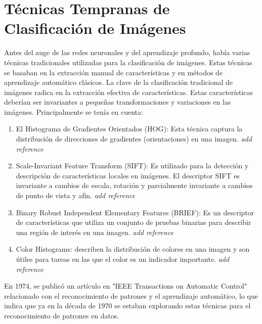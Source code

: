 \section*{Técnicas Tempranas de Clasificación de Imágenes} 

Antes del auge de las redes neuronales y del aprendizaje profundo, había varias técnicas tradicionales utilizadas para la clasificación de imágenes. Estas técnicas se 
basaban en la extracción manual de características y en métodos de aprendizaje automático clásicos. La clave de la clasificación tradicional de imágenes radica en la 
extracción efectiva de características. Estas características deberían ser invariantes a pequeñas transformaciones y variaciones en las imágenes. Principalmente se tenía en cuenta:


\begin{enumerate}
    \item El Histograma de Gradientes Orientados (HOG): Esta técnica captura la distribución de direcciones de gradientes (orientaciones) en una imagen. \textit{add reference}
    
    \item Scale-Invariant Feature Transform (SIFT): Es utilizado para la detección y descripción de características locales en imágenes. El descriptor SIFT es invariante a cambios de escala, rotación y parcialmente invariante a cambios de punto de vista y afín. \textit{add reference}
    
    \item Binary Robust Independent Elementary Features (BRIEF): Es un descriptor de características que utiliza un conjunto de pruebas binarias para describir una región de interés en una imagen. \textit{add reference}
    
    \item Color Histograms: describen la distribución de colores en una imagen y son útiles para tareas en las que el color es un indicador importante. \textit{add reference}
\end{enumerate}

En 1974, se publicó un artículo en "IEEE Transactions on Automatic Control" %
relacionado con el reconocimiento de patrones y el aprendizaje automático, lo que indica que ya en la década de 1970 se estaban explorando estas técnicas para el reconocimiento de patrones en datos.

